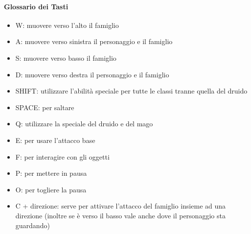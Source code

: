 \documentclass[a4paper,12pt]{report}
\begin{document}
\paragraph{Glossario dei Tasti}
\begin{itemize} 
    \item W: muovere verso l'alto il famiglio
    \item A: muovere verso sinistra il personaggio e il famiglio
    \item S: muovere verso basso il famiglio
    \item D: muovere verso destra il personaggio e il famiglio
    \item SHIFT: utilizzare l'abilità speciale per tutte le classi tranne quella del druido
    \item SPACE: per saltare
    \item Q: utilizzare la speciale del druido e del mago
    \item E: per usare l'attacco base
    \item F: per interagire con gli oggetti
    \item P: per  mettere in pausa
    \item O: per togliere la pausa
    \item C + direzione: serve per attivare l'attacco del famiglio insieme ad una direzione (inoltre se è verso il basso vale anche dove il personaggio sta guardando)
\end{itemize}
\end{document}

